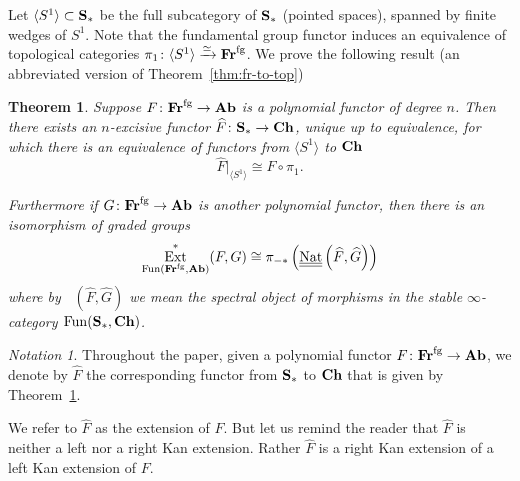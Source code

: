 \documentclass[psamsfonts]{amsart}
\theoremstyle{plain}
\newtheorem{mainthm}{Theorem}
\theoremstyle{definition}
\theoremstyle{remark}
\newtheorem{notn}[thm]{Notation}
\newcommand{\catname}[1]{{\normalfont\textbf{#1}}}
\newcommand{\spheres}[1]{\langle S^#1 \rangle}
\newcommand{\spaces}{\catname{S}_*}
\newcommand{\fr}{\allfr^{\mathrm{fg}}}
\newcommand{\allfr}{\catname{Fr}}
\newcommand{\ab}{\catname{Ab}}
\newcommand{\ch}{\catname{Ch}}
\DeclareMathOperator{\ext}{Ext}
\DeclareMathOperator{\nat}{Nat}
\DeclareMathOperator{\spectralNat}{\underline{\underline{\nat}}}
\DeclareMathOperator{\fun}{Fun}
\begin{document}
Let $\spheres{1}\subset \spaces$ be the full subcategory of $\spaces$ (pointed spaces), spanned by finite wedges of $S^1$. Note that the fundamental group functor induces an equivalence of topological categories $\pi_1\colon \spheres{1}\xrightarrow{\simeq}\fr$. We prove the following result (an abbreviated version of Theorem~\ref{thm:fr-to-top})
\begin{mainthm}\label{thm:fr-to-top_intro}
Suppose $F\colon \fr\to \ab$ is a polynomial functor of degree $n$. Then there exists an $n$-excisive functor $\widehat F\colon \spaces\to \ch$, unique up to equivalence, for which there is an equivalence of functors from $\spheres{1}$ to $\ch$
\[
\widehat F|_{\spheres{1}} \cong F\circ \pi_1.
\]

Furthermore if $G\colon \fr \to \ab$ is another polynomial functor, then there is an isomorphism of graded groups
\begin{equation}\label{eq:Ext=Nat}
\ext^*_{\fun(\fr, \ab)}(F, G)\cong \pi_{-*}\left(\spectralNat\left(\widehat F, \widehat G\right)\right)
\end{equation}
where by $\spectralNat(\widehat F, \widehat G)$ we mean the spectral object of morphisms in the stable $\infty$-category $\fun(\spaces, \ch)$.
\end{mainthm}
\begin{notn}\label{notation:hat}
Throughout the paper, given a polynomial functor $F\colon\fr\to \ab$, we denote by $\widehat F$ the corresponding functor from $\spaces$ to $\ch$ that is given by Theorem~\ref{thm:fr-to-top_intro}.
\end{notn}
We refer to $\widehat F$ as the extension of $F$. But let us remind the reader that $\widehat F$ is neither a left nor a right Kan extension. Rather $\widehat F$ is a right Kan extension of a left Kan extension of $F$.
\end{document}
